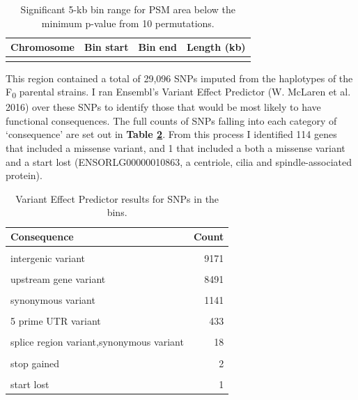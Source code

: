 \documentclass[
]{book}
\begin{document}
\begin{table}

\caption{\label{tab:somite-sig-psm-tbl}Significant 5-kb bin range for PSM area below the minimum p-value from 10 permutations.}
\centering
\begin{tabular}[t]{rrrr}
\toprule
Chromosome & Bin start & Bin end & Length (kb)\\
\midrule
\cellcolor{gray!6}{3} & \cellcolor{gray!6}{20375001} & \cellcolor{gray!6}{26285000} & \cellcolor{gray!6}{5910}\\
\bottomrule
\end{tabular}
\end{table}

This region contained a total of 29,096 SNPs imputed from the haplotypes of the F\textsubscript{0} parental strains. I ran Ensembl's Variant Effect Predictor (W. McLaren et al. 2016) over these SNPs to identify those that would be most likely to have functional consequences. The full counts of SNPs falling into each category of `consequence' are set out in \textbf{Table \ref{tab:psm-consequence-tbl}}. From this process I identified 114 genes that included a missense variant, and 1 that included a both a missense variant and a start lost (ENSORLG00000010863, a centriole, cilia and spindle-associated protein).

\begin{table}

\caption{\label{tab:psm-consequence-tbl}Variant Effect Predictor results for SNPs in the bins.}
\centering
\begin{tabular}[t]{lr}
\toprule
Consequence & Count\\
\midrule
\cellcolor{gray!6}{intron variant} & \cellcolor{gray!6}{23189}\\
intergenic variant & 9171\\
\cellcolor{gray!6}{downstream gene variant} & \cellcolor{gray!6}{8894}\\
upstream gene variant & 8491\\
\cellcolor{gray!6}{3 prime UTR variant} & \cellcolor{gray!6}{2104}\\
\addlinespace
synonymous variant & 1141\\
\cellcolor{gray!6}{missense variant} & \cellcolor{gray!6}{716}\\
5 prime UTR variant & 433\\
\cellcolor{gray!6}{splice region variant,intron variant} & \cellcolor{gray!6}{184}\\
splice region variant,synonymous variant & 18\\
\addlinespace
\cellcolor{gray!6}{missense variant,splice region variant} & \cellcolor{gray!6}{7}\\
stop gained & 2\\
\cellcolor{gray!6}{splice donor variant} & \cellcolor{gray!6}{1}\\
start lost & 1\\
\bottomrule
\end{tabular}
\end{table}
\end{document}
